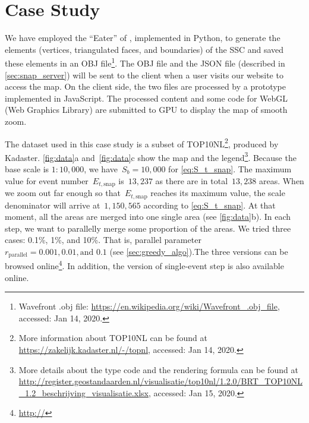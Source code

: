 \documentclass[ijgi,article,submit,moreauthors,pdftex]{Definitions/mdpi}
\begin{document}


\section{Case Study}
\label{sec:case_study}


We have employed the ``Eater'' of \citet{Suba2014Merge},
implemented in Python, 
to generate the elements
(vertices, triangulated faces, and boundaries)
of the SSC \citep{vanOosterom2014tGAPSSC} 
and saved these elements in an OBJ file\footnote{%
Wavefront .obj file:
\url{https://en.wikipedia.org/wiki/Wavefront_.obj_file},
accessed: Jan 14, 2020.}.
%
The OBJ file and the JSON file (described in \sect\ref{sec:snap_server}) 
will be sent to the client 
when a user visits our website to access the map.
On the client side,
the two files are processed
by a prototype implemented in JavaScript.
The processed content and some code for WebGL (Web Graphics Library)
are submitted to GPU to display the map of smooth zoom.

The dataset used in this case study is a subset of TOP10NL\footnote{%
More information about TOP10NL can be found at
\url{https://zakelijk.kadaster.nl/-/topnl},
accessed: Jan 14, 2020.},
produced by Kadaster.
%
\figs\ref{fig:data}a and~\ref{fig:data}c show the map and the legend\footnote{%
More details about the type code and the rendering formula can be found at
\url{http://register.geostandaarden.nl/visualisatie/top10nl/1.2.0/BRT_TOP10NL_1.2_beschrijving_visualisatie.xlsx},
accessed: Jan 15, 2020.}.
%
Because the base scale is $1:10{,}000$, 
we have~$S_b = 10{,}000$ for \eq\ref{eq:S_t_snap}.
The maximum value for event number~$E_{t,\mathrm{snap}}$ is~$13{,}237$
as there are in total~$13{,}238$ areas.
When we zoom out far enough 
so that~$E_{t,\mathrm{snap}}$ reaches its maximum value,
the scale denominator will arrive at~$1{,}150{,}565$
according to \eq\ref{eq:S_t_snap}.
At that moment, all the areas are merged into one single area
(see \figs\ref{fig:data}b).
In each step, we want to parallelly merge some proportion of the areas.
We tried three cases: 0.1\%, 1\%, and 10\%.
That is, parallel parameter~$r_\mathrm{parallel}=0.001, 0.01, \text{and~} 0.1$ 
(see \sect\ref{sec:greedy_algo}).The three versions can be browsed online\footnote{%
\url{http://}}.
In addition, the version of single-event step is also available online.
\end{document}
